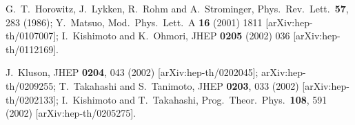 \documentclass[a4paper,11pt]{article}
\begin{document}
\begin{thebibliography}{99}
 {\small G.~T.~Horowitz, J.~Lykken, R.~Rohm and A.~Strominger,
Phys.\ Rev.\ Lett.\ \textbf{57}, 283 (1986);\newline
Y.~Matsuo,
Mod.\ Phys.\ Lett.\ A \textbf{16} (2001) 1811 [arXiv:hep-th/0107007];\newline
I.~Kishimoto and K.~Ohmori,
JHEP \textbf{0205} (2002) 036 [arXiv:hep-th/0112169]. }


 {\small J.~Kluson,
JHEP \textbf{0204}, 043 (2002) [arXiv:hep-th/0202045];
arXiv:hep-th/0209255;\newline
%
T.~Takahashi and S.~Tanimoto,
JHEP \textbf{0203}, 033 (2002) [arXiv:hep-th/0202133];\newline
%
I.~Kishimoto and T.~Takahashi,
Prog.\ Theor.\ Phys.\  {\bf 108}, 591 (2002)
[arXiv:hep-th/0205275].
}
\end{thebibliography}
\end{document}
